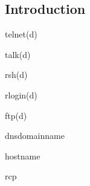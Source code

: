
\subsection{Introduction}


telnet(d)

talk(d)

rsh(d)

rlogin(d)

ftp(d)

dnsdomainname

hostname

rcp
